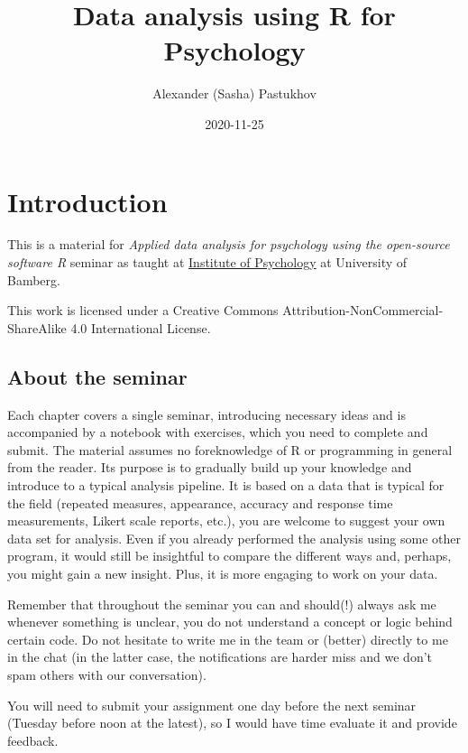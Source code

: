 \documentclass[
]{book}
\title{Data analysis using R for Psychology}
\author{Alexander (Sasha) Pastukhov}
\date{2020-11-25}
\begin{document}
\maketitle

{
\setcounter{tocdepth}{1}
\tableofcontents
}
\hypertarget{introduction}{%
\chapter*{Introduction}\label{introduction}}

This is a material for \emph{Applied data analysis for psychology using the open-source software R} seminar as taught at \href{https://www.uni-bamberg.de/psychologie/}{Institute of Psychology} at University of Bamberg.

This work is licensed under a Creative Commons Attribution-NonCommercial-ShareAlike 4.0 International License.

\hypertarget{about-the-seminar}{%
\section*{About the seminar}\label{about-the-seminar}}

Each chapter covers a single seminar, introducing necessary ideas and is accompanied by a notebook with exercises, which you need to complete and submit. The material assumes no foreknowledge of R or programming in general from the reader. Its purpose is to gradually build up your knowledge and introduce to a typical analysis pipeline. It is based on a data that is typical for the field (repeated measures, appearance, accuracy and response time measurements, Likert scale reports, etc.), you are welcome to suggest your own data set for analysis. Even if you already performed the analysis using some other program, it would still be insightful to compare the different ways and, perhaps, you might gain a new insight. Plus, it is more engaging to work on your data.

Remember that throughout the seminar you can and should(!) always ask me whenever something is unclear, you do not understand a concept or logic behind certain code. Do not hesitate to write me in the team or (better) directly to me in the chat (in the latter case, the notifications are harder miss and we don't spam others with our conversation).

You will need to submit your assignment one day before the next seminar (Tuesday before noon at the latest), so I would have time evaluate it and provide feedback.
\end{document}
